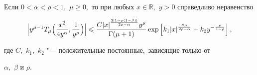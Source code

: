 \begin{lemma}[3]Если $0<\alpha<\rho<1,$ $\mu\geqslant 0,$ то при любых $x\in\mathbb{R},$ $y>0$ справедливо неравенство

\begin{equation} \label{T_muOtsenka}  

\Bigl| y^{\mu-1} T_{\mu}\Bigl(\frac{x^2}{4y^{\alpha}},\frac{1}{y^{\rho}}\Bigr)\Bigr|

\leqslant 

\frac{C

|x|^{\frac{2[1-\rho(1-\beta)]}{2\rho-\alpha}} y^{\mu}}{\Gamma(\mu+1)}\exp\left[ k_1  |x|^{\frac{2\rho}{2\rho-\alpha}}-k_2   y^{-\frac{\rho}{1-\rho}}\right],

\end{equation}    

где $C,$ $k_1,$ $k_2$ "--- положительные постоянные$,$ зависящие только от 

$\alpha,$ $\beta$ и $\rho.$

\end{lemma}



\smallskip



